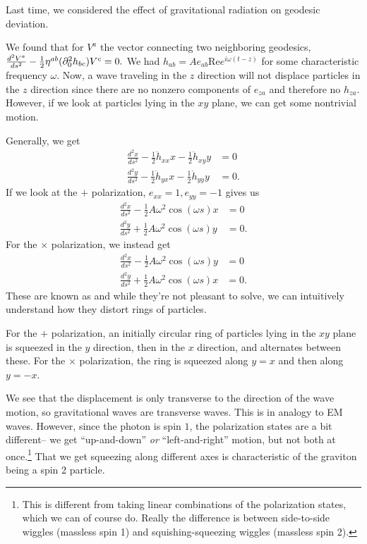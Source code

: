 Last time, we considered the effect of gravitational radiation on geodesic deviation.

We found that for $V^a$ the vector connecting two neighboring geodesics,
$\frac{d^2V^a}{ds^2}-\frac{1}{2}\eta^{ab}(\partial_0^2 h_{bc}) V^c=0.$
We had $h_{ab}=Ae_{ab}\text{Re}e^{i\omega(t-z)}$
for some characteristic frequency $\omega$. Now, a wave traveling in the $z$ direction will not displace particles in the $z$ direction since there are no nonzero components of $e_{za}$ and therefore no $h_{za}$. However, if we look at particles lying in the $xy$ plane, we can get some nontrivial motion.

Generally, we get
\begin{align*}
    \frac{d^2x}{ds^2}-\frac{1}{2}\ddot h_{xx}x -\frac{1}{2}\ddot h_{xy}y &=0\\
    \frac{d^2y}{ds^2}-\frac{1}{2}\ddot h_{yx}x-\frac{1}{2} \ddot h_{yy}y&=0.
\end{align*}
If we look at the $+$ polarization, $e_{xx}=1,e_{yy}=-1$ gives us
\begin{align*}
    \frac{d^2x}{ds^2}-\frac{1}{2}A\omega^2 \cos(\omega s) x &=0\\
    \frac{d^2y}{ds^2}+\frac{1}{2} A\omega^2 \cos(\omega s) y&=0.
\end{align*}
For the $\times$ polarization, we instead get
\begin{align*}
    \frac{d^2x}{ds^2}-\frac{1}{2}A\omega^2 \cos(\omega s) y &=0\\
    \frac{d^2y}{ds^2}+\frac{1}{2} A\omega^2 \cos(\omega s) x&=0.
\end{align*}
These are known as  and while they're not pleasant to solve, we can intuitively understand how they distort rings of particles.

For the $+$ polarization, an initially circular ring of particles lying in the $xy$ plane is squeezed in the $y$ direction, then in the $x$ direction, and alternates between these. For the $\times$ polarization, the ring is squeezed along $y=x$ and then along $y=-x$.

We see that the displacement is only transverse to the direction of the wave motion, so gravitational waves are transverse waves. This is in analogy to EM waves. However, since the photon is spin $1$, the polarization states are a bit different-- we get ``up-and-down'' \emph{or} ``left-and-right'' motion, but not both at once.\footnote{This is different from taking linear combinations of the polarization states, which we can of course do. Really the difference is between side-to-side wiggles (massless spin 1) and squishing-squeezing wiggles (massless spin 2).} That we get squeezing along different axes is characteristic of the graviton being a spin 2 particle.

